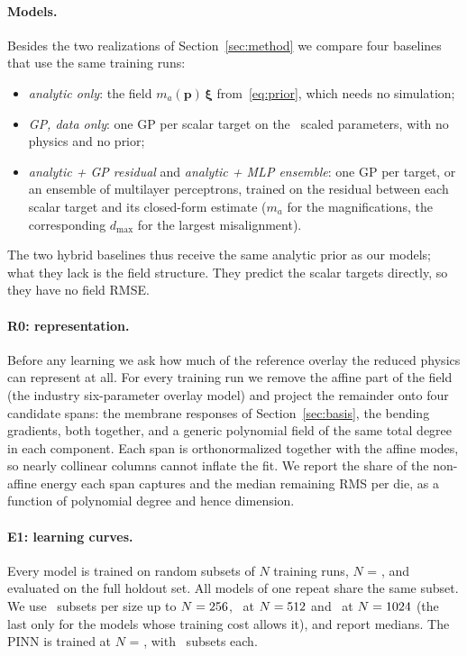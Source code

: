 \documentclass[11pt]{article}
\begin{document}
\paragraph{Models.} Besides the two realizations of Section~\ref{sec:method} we compare four baselines that use the
same training runs:
\begin{itemize}
  \item \emph{analytic only}: the field $m_a(\mathbf{p})\,\boldsymbol\xi$ from~\eqref{eq:prior}, which needs no
        simulation;
  \item \emph{GP, data only}: one GP per scalar target on the \NParams~scaled parameters, with no physics and no prior;
  \item \emph{analytic + GP residual} and \emph{analytic + MLP ensemble}: one GP per target, or an ensemble of
        multilayer perceptrons, trained on the residual between each scalar target and its closed-form estimate
        ($m_a$ for the magnifications, the corresponding $d_{\max}$ for the largest misalignment).
\end{itemize}
The two hybrid baselines thus receive the same analytic prior as our models; what they lack is the field structure.
They predict the scalar targets directly, so they have no field RMSE.

\paragraph{R0: representation.} Before any learning we ask how much of the reference overlay the reduced physics can
represent at all. For every training run we remove the affine part of the field (the industry six-parameter overlay
model) and project the remainder onto four candidate spans: the membrane responses of Section~\ref{sec:basis}, the
bending gradients, both together, and a generic polynomial field of the same total degree in each component. Each span
is orthonormalized together with the affine modes, so nearly collinear columns cannot inflate the fit. We report the
share of the non-affine energy each span captures and the median remaining RMS per die, as a function of polynomial
degree and hence dimension.

\paragraph{E1: learning curves.} Every model is trained on random subsets of $N$ training runs, $N$ = \EoneSizes, and
evaluated on the full holdout set. All models of one repeat share the same subset. We use \EoneRepsSmall~subsets per
size up to $N=256$, \EoneRepsFiveTwelve~at $N=512$ and \EoneRepsMax~at $N=1024$ (the last only for the models whose
training cost allows it), and report medians. The PINN is trained at $N$ = \PinnSizes, with \PinnReps~subsets each.
\end{document}
